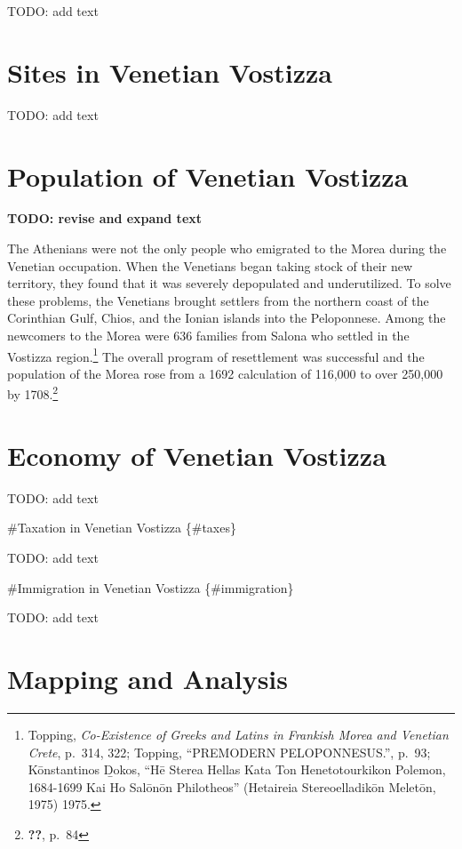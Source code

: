 \documentclass[english,]{book}
\begin{document}
TODO: add text

\hypertarget{sites}{%
\chapter{Sites in Venetian Vostizza}\label{sites}}

TODO: add text

\hypertarget{population}{%
\chapter{Population of Venetian Vostizza}\label{population}}

\textbf{TODO: revise and expand text}

The Athenians were not the only people who emigrated to the Morea during the Venetian occupation. When the Venetians began taking stock of their new territory, they found that it was severely depopulated and underutilized. To solve these problems, the Venetians brought settlers from the northern coast of the Corinthian Gulf, Chios, and the Ionian islands into the Peloponnese. Among the newcomers to the Morea were 636 families from Salona who settled in the Vostizza region.\footnote{Topping, \emph{Co-Existence of Greeks and Latins in Frankish Morea and Venetian Crete}, p.~314, 322; Topping, ``PREMODERN PELOPONNESUS.'', p.~93; Kōnstantinos D̲okos, ``Hē Sterea Hellas Kata Ton Henetotourkikon Polemon, 1684-1699 Kai Ho Salōnōn Philotheos'' (Hetaireia Stereoelladikōn Meletōn, 1975) 1975.} The overall program of resettlement was successful and the population of the Morea rose from a 1692 calculation of 116,000 to over 250,000 by 1708.\footnote{{\textbf{??}}, p.~84}

\hypertarget{economy}{%
\chapter{Economy of Venetian Vostizza}\label{economy}}

TODO: add text

\#Taxation in Venetian Vostizza \{\#taxes\}

TODO: add text

\#Immigration in Venetian Vostizza \{\#immigration\}

TODO: add text

\hypertarget{mapping}{%
\chapter{Mapping and Analysis}\label{mapping}}
\end{document}
